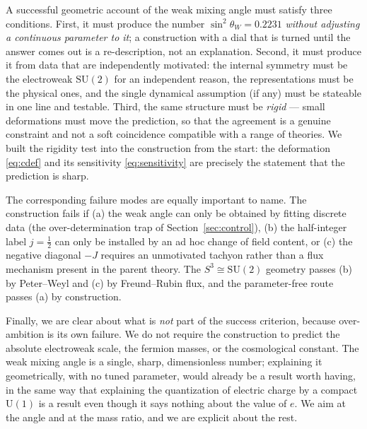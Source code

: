 \documentclass[11pt]{article}
\theoremstyle{plain}
\theoremstyle{definition}
\newcommand{\half}{\tfrac12}
\newcommand{\sinsq}{\sin^{2}\theta_W}
\newcommand{\SU}{\mathrm{SU}}
\newcommand{\U}{\mathrm{U}}
\begin{document}
A successful geometric account of the weak mixing angle must satisfy three
conditions. First, it must produce the number $\sinsq=0.2231$ \emph{without
adjusting a continuous parameter to it}; a construction with a dial that is
turned until the answer comes out is a re-description, not an explanation.
Second, it must produce it from data that are independently motivated: the
internal symmetry must be the electroweak $\SU(2)$ for an independent
reason, the representations must be the physical ones, and the single
dynamical assumption (if any) must be stateable in one line and testable.
Third, the same structure must be \emph{rigid} --- small deformations must
move the prediction, so that the agreement is a genuine constraint and not a
soft coincidence compatible with a range of theories. We built the rigidity
test into the construction from the start: the deformation \eqref{eq:cdef}
and its sensitivity \eqref{eq:sensitivity} are precisely the statement that
the prediction is sharp.

The corresponding failure modes are equally important to name. The
construction fails if (a) the weak angle can only be obtained by fitting
discrete data (the over-determination trap of Section~\ref{sec:control}),
(b) the half-integer label $j=\half$ can only be installed by an ad hoc
change of field content, or (c) the negative diagonal $-J$ requires an
unmotivated tachyon rather than a flux mechanism present in the parent
theory. The $S^3\cong\SU(2)$ geometry passes (b) by Peter--Weyl and (c) by
Freund--Rubin flux, and the parameter-free route passes (a) by construction.

Finally, we are clear about what is \emph{not} part of the success
criterion, because over-ambition is its own failure. We do not require the
construction to predict the absolute electroweak scale, the fermion masses,
or the cosmological constant. The weak mixing angle is a single, sharp,
dimensionless number; explaining it geometrically, with no tuned parameter,
would already be a result worth having, in the same way that explaining the
quantization of electric charge by a compact $\U(1)$ is a result even though
it says nothing about the value of $e$. We aim at the angle and at the mass
ratio, and we are explicit about the rest.
\end{document}
